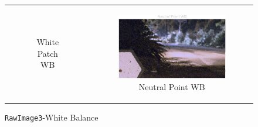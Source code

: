 \documentclass[11pt, a4]{article}
\begin{document}
\begin{enumerate}
\begin{enumerate}
\begin{figure}[h]
{\begin{tabular}{cc}
\begin{subfigure}[h]{0.45\linewidth}
							\caption{White Patch WB}
							\label{fig:RawImage3_WB_3}
						\end{subfigure} &
						\begin{subfigure}[h]{0.45\linewidth}
							\centering
							\includegraphics[width=\linewidth]{../output/RawImage3_WB_4.pdf}
							\caption{Neutral Point WB}
							\label{fig:RawImage3_WB_4}
						\end{subfigure}
					\end{tabular}
				}
				\caption{\texttt{RawImage3}-White Balance}
				\label{fig:RawImage3_WB}
			\end{figure}
			\begin{figure}[h]
				\centering
\end{figure}
\end{enumerate}
\end{enumerate}
\end{document}
